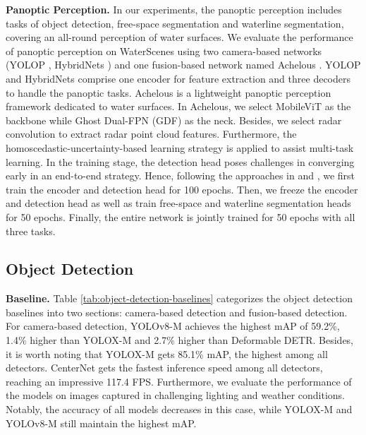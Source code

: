 \documentclass[lettersize,journal]{IEEEtran}
\begin{document}
\textbf{Panoptic Perception.} In our experiments, the panoptic perception includes tasks of object detection, free-space segmentation and waterline segmentation, covering an all-round perception of water surfaces. We evaluate the performance of panoptic perception on WaterScenes using two camera-based networks (YOLOP \cite{wu2022yolop}, HybridNets \cite{vu2022hybridnets}) and one fusion-based network named Achelous \cite{guan2023achelous}. 
YOLOP and HybridNets comprise one encoder for feature extraction and three decoders to handle the panoptic tasks. Achelous \cite{guan2023achelous} is a lightweight panoptic perception framework dedicated to water surfaces. 
In Achelous, we select MobileViT \cite{mehta2021mobilevit} as the backbone while Ghost Dual-FPN (GDF) as the neck. Besides, we select radar convolution to extract radar point cloud features. Furthermore, the homoscedastic-uncertainty-based learning strategy \cite{kendall2018multi} is applied to assist multi-task learning.
In the training stage, the detection head poses challenges in converging early in an end-to-end strategy. Hence, following the approaches in \cite{wu2022yolop} and \cite{vu2022hybridnets}, we first train the encoder and detection head for 100 epochs. Then, we freeze the encoder and detection head as well as train free-space and waterline segmentation heads for 50 epochs. Finally, the entire network is jointly trained for 50 epochs with all three tasks.

\subsection{Object Detection}

\textbf{Baseline.} Table \ref{tab:object-detection-baselines} categorizes the object detection baselines into two sections: camera-based detection and fusion-based detection.
For camera-based detection, YOLOv8-M achieves the highest mAP of 59.2\%, 1.4\% higher than YOLOX-M and 2.7\% higher than Deformable DETR. Besides, it is worth noting that YOLOX-M gets 85.1\% mAP, the highest among all detectors. CenterNet gets the fastest inference speed among all detectors, reaching an impressive 117.4 FPS. 
Furthermore, we evaluate the performance of the models on images captured in challenging lighting and weather conditions. Notably, the accuracy of all models decreases in this case, while YOLOX-M and YOLOv8-M still maintain the highest mAP. 
\end{document}
